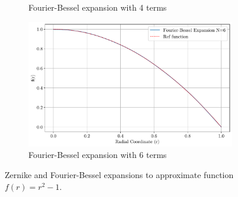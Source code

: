 \begin{figure}
\begin{subfigure}[b]{0.48\textwidth}
        \caption{Fourier-Bessel expansion with 4 terms}
    \end{subfigure}
    \hspace{1em}
    \begin{subfigure}[b]{0.48\textwidth}
        \centering
        \includegraphics[width=\textwidth]{figs/bessel_exp_6.pdf}
        \caption{Fourier-Bessel expansion with 6 terms}
    \end{subfigure}
    \caption{Zernike and Fourier-Bessel expansions to approximate function $f(r)=r^2-1$.}
    \label{fig_y}
\end{figure}

